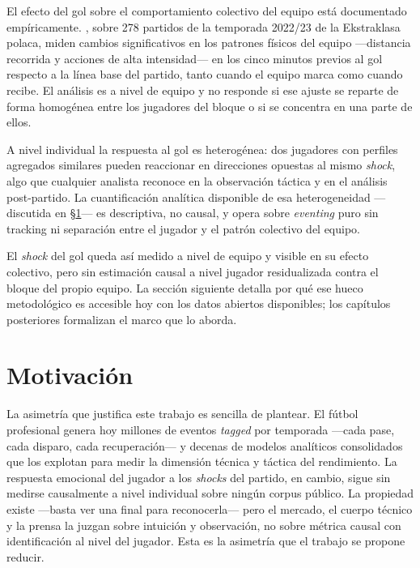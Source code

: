 El efecto del gol sobre el comportamiento colectivo del equipo está
documentado empíricamente. \textcite{Konefal2024}, sobre 278 partidos
de la temporada 2022/23 de la Ekstraklasa polaca, miden cambios
significativos en los patrones físicos del equipo ---distancia recorrida
y acciones de alta intensidad--- en los cinco minutos previos al gol
respecto a la línea base del partido, tanto cuando el equipo marca como
cuando recibe. El análisis
es a nivel de equipo y no responde si ese ajuste se reparte de forma
homogénea entre los jugadores del bloque o si se concentra en una parte
de ellos.

A nivel individual la respuesta al gol es heterogénea: dos jugadores
con perfiles agregados similares pueden reaccionar en direcciones
opuestas al mismo \textit{shock}, algo que cualquier analista
reconoce en la observación táctica y en el análisis post-partido. La
cuantificación analítica disponible de esa heterogeneidad ---discutida
en §\ref{sec:motivacion}--- es descriptiva, no causal, y opera sobre
\textit{eventing} puro sin tracking ni separación entre el jugador y
el patrón colectivo del equipo.

El \textit{shock} del gol queda así medido a nivel de equipo y visible
en su efecto colectivo, pero sin estimación causal a nivel jugador
residualizada contra el bloque del propio equipo. La sección siguiente
detalla por qué ese hueco metodológico es accesible hoy con los datos
abiertos disponibles; los capítulos posteriores formalizan el marco
que lo aborda.


\section{Motivación}
\label{sec:motivacion}

La asimetría que justifica este trabajo es sencilla de plantear. El
fútbol profesional genera hoy millones de eventos \textit{tagged} por
temporada ---cada pase, cada disparo, cada recuperación--- y decenas
de modelos analíticos consolidados que los explotan para medir la
dimensión técnica y táctica del rendimiento. La
respuesta emocional del jugador a los \textit{shocks} del partido,
en cambio, sigue sin medirse causalmente a nivel individual sobre
ningún corpus público. La propiedad existe ---basta ver una final
para reconocerla--- pero el mercado, el cuerpo técnico y la prensa
la juzgan sobre intuición y observación, no sobre métrica causal con
identificación al nivel del jugador. Esta es la asimetría que el
trabajo se propone reducir.

